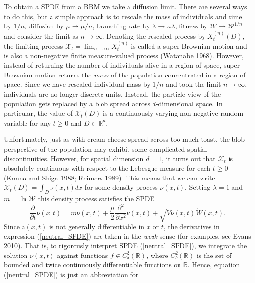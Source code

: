 \documentclass[]{article}
\begin{document}
To obtain a SPDE from a BBM we take a diffusion limit. There are several
ways to do this, but a simple approach is to rescale the mass of
individuals and time by \(1/n\), diffusion by \(\mu\to\mu/n\), branching
rate by \(\lambda\to n\lambda\), fitness by
\(\mathscr{W}\to\mathscr{W}^{1/n}\) and consider the limit as
\(n\to\infty\). Denoting the rescaled process by \(X_t^{(n)}(D)\), the
limiting process \(\mathscr{X}_t=\lim_{n\to\infty}X_t^{(n)}\) is called
a super-Brownian motion and is also a non-negative finite measure-valued
process (Watanabe 1968). However, instead of returning the number of
individuals alive in a region of space, super-Brownian motion returns
the \emph{mass} of the population concentrated in a region of space.
Since we have rescaled individual mass by \(1/n\) and took the limit
\(n\to\infty\), individuals are no longer discrete units. Instead, the
particle view of the population gets replaced by a blob spread across
\(d\)-dimensional space. In particular, the value of
\(\mathscr{X}_t(D)\) is a continuously varying non-negative random
variable for any \(t\geq0\) and \(D\subset\mathbb{R}^d\).

Unfortunately, just as with cream cheese spread across too much toast,
the blob perspective of the population may exhibit some complicated
spatial discontinuities. However, for spatial dimension \(d=1\), it
turns out that \(\mathscr{X}_t\) is absolutely continuous with respect
to the Lebesgue measure for each \(t\geq0\) (Konno and Shiga 1988;
Reimers 1989). This means that we can write
\(\mathscr{X}_t(D)=\int_D \nu(x,t)dx\) for some density process
\(\nu(x,t)\). Setting \(\lambda=1\) and \(m=\ln\mathscr{W}\) this
density process satisfies the SPDE \begin{equation}\label{neutral_SPDE}
\frac{\partial}{\partial t}\nu(x,t)=m\nu(x,t)+\frac{\mu}{2}\frac{\partial^2}{\partial x^2}\nu(x,t)+\sqrt{V\nu(x,t)}\dot W(x,t).
\end{equation} Since \(\nu(x,t)\) is not generally differentiable in
\(x\) or \(t\), the derivatives in expression (\ref{neutral_SPDE}) are
taken in the \emph{weak} sense (for examples, see Evans 2010). That is,
to rigorously interpret SPDE (\ref{neutral_SPDE}), we integrate the
solution \(\nu(x,t)\) against functions \(f\in C_b^2(\mathbb{R})\),
where \(C_b^2(\mathbb{R})\) is the set of bounded and twice continuously
differentiable functions on \(\mathbb{R}\). Hence, equation
(\ref{neutral_SPDE}) is just an abbreviation for
\end{document}
